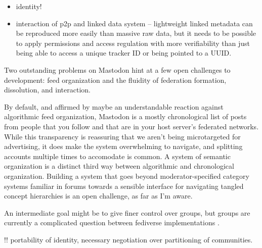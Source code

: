 \documentclass[notoc]{tufte-book}
\begin{document}
\begin{itemize}

\item
  identity!
\item
  interaction of p2p and linked data system -- lightweight linked
  metadata can be reproduced more easily than massive raw data, but it
  needs to be possible to apply permissions and access regulation with
  more verifiability than just being able to access a unique tracker ID
  or being pointed to a UUID.
\end{itemize}

Two outstanding problems on Mastodon hint at a few open challenges to
development: feed organization and the fluidity of federation formation,
dissolution, and interaction.

By default, and affirmed by maybe an understandable reaction against
algorithmic feed organization, Mastodon is a mostly chronological list
of posts from people that you follow and that are in your host server's
federated networks. While this transparency is reassuring that we aren't
being microtargeted for advertising, it does make the system
overwhelming to navigate, and splitting accounts multiple times to
accomodate is common. A system of semantic organization is a distinct
third way between algorithmic and chronological organization. Building a
system that goes beyond moderator-specified category systems familiar in
forums towards a sensible interface for navigating tangled concept
hierarchies is an open challenge, as far as I'm aware.

An intermediate goal might be to give finer control over groups, but
groups are currently a complicated question between fediverse
implementations \citep{StandardizingActivityPubGroups2021} .

!! portability of identity, necessary negotiation over partitioning of
communities. 

\backmatter
 
 
\end{document}
